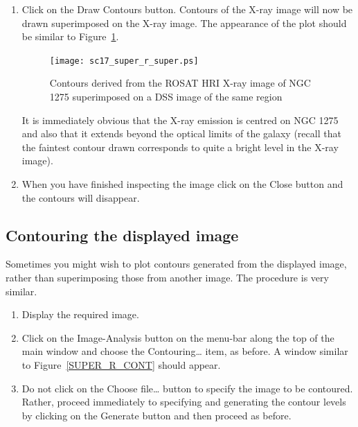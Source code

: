 \documentclass[twoside,11pt]{article}
\begin{document}
\begin{enumerate}
  \item Click on the {\sf Draw Contours} button.  Contours of the X-ray
   image will now be drawn superimposed on the X-ray image.  The
   appearance of the plot should be similar to Figure~\ref{SUPER_R_SUPER}.

  \begin{figure}[htbp]
     \centering
     \texttt{[image: sc17\_super\_r\_super.ps]}
     \begin{quote}
     \caption[X-ray contours superimposed a DSS image of NGC 1275]
      {Contours derived from the ROSAT HRI X-ray image of NGC 1275
      superimposed on a DSS image of the same region
     \label{SUPER_R_SUPER} }
     \end{quote}
  \end{figure}

   It is immediately obvious that the X-ray emission is centred on NGC
   1275 and also that it extends beyond the optical limits of the
   galaxy (recall that the faintest contour drawn corresponds to quite
   a bright level in the X-ray image).

  \item When you have finished inspecting the image click on the {\sf
   Close} button and the contours will disappear.

\end{enumerate}

\subsection{Contouring the displayed image}

Sometimes you might wish to plot contours generated from the displayed
image, rather than superimposing those from another image.  The procedure
is very similar.

\begin{enumerate}

  \item Display the required image.

  \item Click on the {\sf Image-Analysis} button on the menu-bar along the
   top of the main window and choose the {\sf Contouring\ldots} item, as
   before.  A window similar to Figure~\ref{SUPER_R_CONT} should appear.

  \item Do not click on the {\sf Choose file\ldots} button to specify
   the image to be contoured.  Rather, proceed immediately to specifying
   and generating the contour levels by clicking on the {\sf Generate}
   button and then proceed as before.

\end{enumerate}
\end{document}
